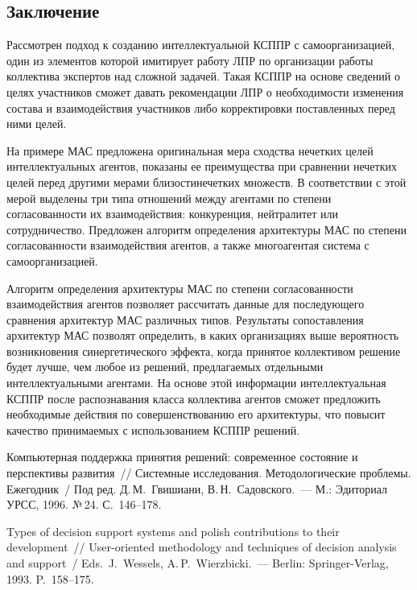 \begin{multicols}{2}
\section{Заключение}
  
  Рассмотрен подход к созданию интеллектуальной \mbox{КСППР} с 
самоорганизацией, один из элементов которой имитирует работу ЛПР по 
организации работы коллектива экспертов над сложной задачей. Такая \mbox{КСППР} 
на основе сведений о целях участников сможет давать рекомендации ЛПР о 
необходимости изменения состава и взаимодействия участников либо 
корректировки поставленных перед ними целей.
  
  На примере МАС предложена оригинальная мера сходства нечетких целей 
интеллектуальных агентов, показаны ее преимущества при сравнении нечетких 
целей перед другими мерами близости\linebreak нечетких множеств. В соответствии с 
этой мерой выделены три типа отношений между агентами по степени 
согласованности их взаимодействия: конкуренция, нейтралитет или 
сотрудничество. Предложен алгоритм определения архитектуры МАС по 
степени согласованности взаимодействия агентов, а также многоагентая 
система с самоорганизацией.
  
  Алгоритм определения архитектуры МАС по степени согласованности 
взаимодействия агентов позволяет рассчитать данные для последующего 
сравнения архитектур МАС различных типов. Результаты сопоставления 
архитектур МАС позволят определить, в каких организациях выше вероятность 
возникновения синергетического эффекта, когда принятое коллективом 
решение будет лучше, чем любое из решений, предлагаемых отдельными 
интеллектуальными агентами. На основе этой информации интеллектуальная 
\mbox{КСППР} после распознавания класса коллектива агентов сможет предложить 
необходимые действия по совершенствованию его архитектуры, что повысит 
качество принимаемых с использованием \mbox{КСППР} решений.
  
{\small\frenchspacing
{%
\begin{thebibliography}{99}    

Компьютерная поддержка принятия решений: современное состояние и 
перспективы развития~// Системные исследования. Методологические 
проблемы. Ежегодник~/ Под ред. Д.\,М.~Гвишиани, В.\,Н.~Садовского.~--- М.: 
Эдиториал УРСС, 1996. №\,24. С.~146--178.

Types of decision support systems and polish contributions to their development~// 
User-oriented methodology and techniques of decision analysis and support~/ Eds.\ 
J.~Wessels, A.\,P.~Wierzbicki.~--- Berlin: Springer-Verlag, 1993. 
P.~158--175.


\end{thebibliography}}}
\end{multicols}

